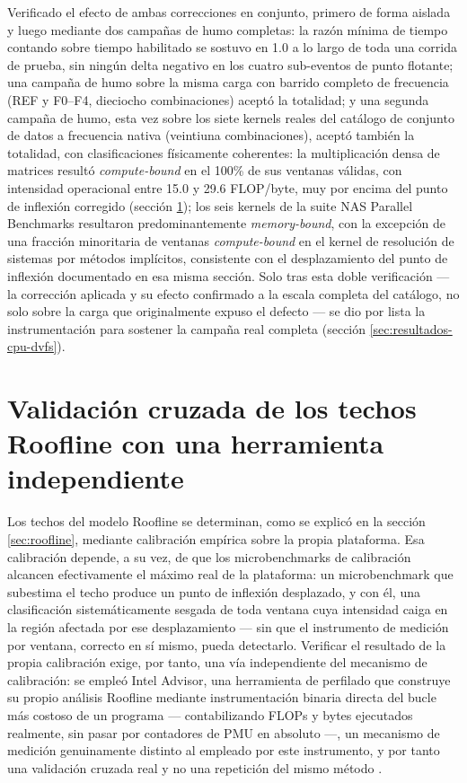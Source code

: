 \documentclass[12pt,oneside,spanish]{book}
\begin{document}
Verificado el efecto de ambas correcciones en conjunto, primero de forma aislada y luego mediante dos campañas de humo completas: la razón mínima de tiempo contando sobre tiempo habilitado se sostuvo en 1.0 a lo largo de toda una corrida de prueba, sin ningún delta negativo en los cuatro sub-eventos de punto flotante; una campaña de humo sobre la misma carga con barrido completo de frecuencia (REF y F0--F4, dieciocho combinaciones) aceptó la totalidad; y una segunda campaña de humo, esta vez sobre los siete kernels reales del catálogo de conjunto de datos a frecuencia nativa (veintiuna combinaciones), aceptó también la totalidad, con clasificaciones físicamente coherentes: la multiplicación densa de matrices resultó \textit{compute-bound} en el 100\% de sus ventanas válidas, con intensidad operacional entre 15.0 y 29.6 FLOP/byte, muy por encima del punto de inflexión corregido (sección \ref{sec:resultados-ppico}); los seis kernels de la suite NAS Parallel Benchmarks resultaron predominantemente \textit{memory-bound}, con la excepción de una fracción minoritaria de ventanas \textit{compute-bound} en el kernel de resolución de sistemas por métodos implícitos, consistente con el desplazamiento del punto de inflexión documentado en esa misma sección. Solo tras esta doble verificación --- la corrección aplicada y su efecto confirmado a la escala completa del catálogo, no solo sobre la carga que originalmente expuso el defecto --- se dio por lista la instrumentación para sostener la campaña real completa (sección \ref{sec:resultados-cpu-dvfs}).

\section{Validación cruzada de los techos Roofline con una herramienta independiente}
\label{sec:resultados-ppico}

Los techos del modelo Roofline se determinan, como se explicó en la sección \ref{sec:roofline}, mediante calibración empírica sobre la propia plataforma. Esa calibración depende, a su vez, de que los microbenchmarks de calibración alcancen efectivamente el máximo real de la plataforma: un microbenchmark que subestima el techo produce un punto de inflexión desplazado, y con él, una clasificación sistemáticamente sesgada de toda ventana cuya intensidad caiga en la región afectada por ese desplazamiento --- sin que el instrumento de medición por ventana, correcto en sí mismo, pueda detectarlo. Verificar el resultado de la propia calibración exige, por tanto, una vía independiente del mecanismo de calibración: se empleó Intel Advisor, una herramienta de perfilado que construye su propio análisis Roofline mediante instrumentación binaria directa del bucle más costoso de un programa --- contabilizando FLOPs y bytes ejecutados realmente, sin pasar por contadores de PMU en absoluto ---, un mecanismo de medición genuinamente distinto al empleado por este instrumento, y por tanto una validación cruzada real y no una repetición del mismo método \cite{Advisor2026}.
\end{document}
